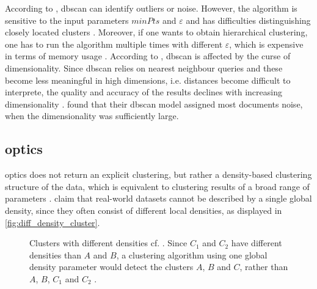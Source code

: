 According to \citeauthor{OPTICS_kMeans_2016}, \ac{dbscan} can identify outliers or noise.
However, the algorithm is sensitive to the input parameters $minPts$ and $\varepsilon$ and has difficulties distinguishing closely located clusters \cite{OPTICS_kMeans_2016}.
Moreover, if one wants to obtain hierarchical clustering, one has to run the algorithm multiple times with different $\varepsilon$, which is expensive in terms of memory usage \cite{OPTICS2013}.
According to \citeauthor{clusteringDocs2020}, \ac{dbscan} is affected by the curse of dimensionality.
Since \ac{dbscan} relies on nearest neighbour queries and these become less meaningful in high dimensions, i.e. distances become difficult to interprete, 
the quality and accuracy of the results declines with increasing dimensionality \cite{clusteringDocs2020}.
\citeauthor{clusteringDocs2020} found that their \ac{dbscan} model assigned most documents noise, when the dimensionality was sufficiently large.


\subsection{\acs*{optics}}\label{subsec:optics}

\ac{optics} does not return an explicit clustering, but rather a density-based clustering structure of the data, 
which is equivalent to clustering results of a broad range of parameters \cite{OPTICS1999}.
\citeauthor{OPTICS1999} claim that real-world datasets cannot be described by a single global density, since they often consist of different local densities, 
as displayed in \autoref{fig:diff_density_cluster}.

\begin{figure}[htp] %
    \centering
    
    \caption[Clusters with different densities]{Clusters with different densities cf. \cite{OPTICS1999}.
    Since $C_1$ and $C_2$ have different densities than $A$ and $B$, a clustering algorithm using one global density parameter would detect the clusters $A$, $B$ and $C$, 
    rather than $A$, $B$, $C_1$ and $C_2$ .
    }
    \label{fig:diff_density_cluster}
\end{figure}

